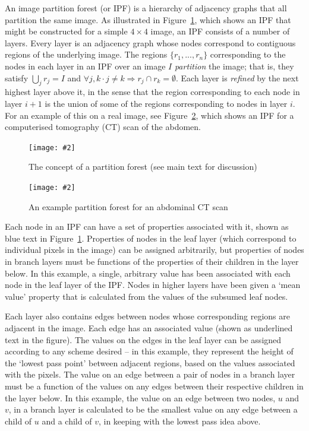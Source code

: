\documentclass[10pt,twocolumn,twoside]{IEEEtran}
\newcommand{\stufigex}[5]					%
{
	\begin{figure}[#5]
	\begin{center}
		\texttt{[image: \#2]}
		\caption{#3}
		\label{#4}
	\end{center}
	\end{figure}
}
\begin{document}
An image partition forest (or IPF) is a hierarchy of adjacency graphs that all partition the same image. As illustrated in Figure~\ref{fig:ipfs-concept}, which shows an IPF that might be constructed for a simple $4 \times 4$ image, an IPF consists of a number of layers. Every layer is an adjacency graph whose nodes correspond to contiguous regions of the underlying image. The regions $\{r_1,...,r_n\}$ corresponding to the nodes in each layer in an IPF over an image $I$ \emph{partition} the image; that is, they satisfy $\bigcup_j r_j = I$ and $\forall j, k \cdot j \ne k \Rightarrow r_j \cap r_k = \emptyset$. Each layer is \emph{refined} by the next highest layer above it, in the sense that the region corresponding to each node in layer $i + 1$ is the union of some of the regions corresponding to nodes in layer $i$. For an example of this on a real image, see Figure~\ref{fig:ipfs-ctconcept}, which shows an IPF for a computerised tomography (CT) scan of the abdomen.

\stufigex{width=.9\linewidth}{ipfs-concept.png}{The concept of a partition forest (see main text for discussion)}{fig:ipfs-concept}{htb}

\stufigex{width=.9\linewidth}{ipfs-ctconcept.png}{An example partition forest for an abdominal CT scan}{fig:ipfs-ctconcept}{htb}

Each node in an IPF can have a set of properties associated with it, shown as blue text in Figure~\ref{fig:ipfs-concept}. Properties of nodes in the leaf layer (which correspond to individual pixels in the image) can be assigned arbitrarily, but properties of nodes in branch layers must be functions of the properties of their children in the layer below. In this example, a single, arbitrary value has been associated with each node in the leaf layer of the IPF. Nodes in higher layers have been given a `mean value' property that is calculated from the values of the subsumed leaf nodes.

Each layer also contains edges between nodes whose corresponding regions are adjacent in the image. Each edge has an associated value (shown as underlined text in the figure). The values on the edges in the leaf layer can be assigned according to any scheme desired -- in this example, they represent the height of the `lowest pass point' between adjacent regions, based on the values associated with the pixels. The value on an edge between a pair of nodes in a branch layer must be a function of the values on any edges between their respective children in the layer below. In this example, the value on an edge between two nodes, $u$ and $v$, in a branch layer is calculated to be the smallest value on any edge between a child of $u$ and a child of $v$, in keeping with the lowest pass idea above.
\end{document}
